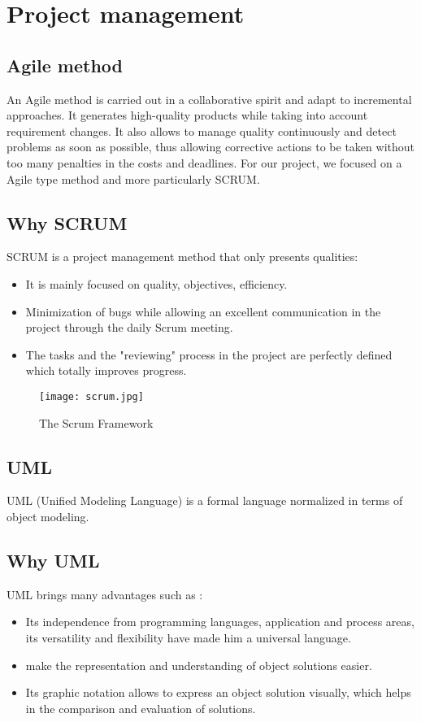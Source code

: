 \section{Project management}

\subsection{Agile method}
An Agile method is carried out in a collaborative spirit and adapt to incremental approaches. It generates high-quality products while taking into account requirement changes. It also allows
to manage quality continuously and detect problems as soon as possible,
thus allowing corrective actions to be taken without too many penalties in the
costs and deadlines. For our project, we focused on a
Agile type method and more particularly SCRUM\cite{cite0}.

\subsection{Why SCRUM}
SCRUM is a project management method that only presents qualities: 

\begin{itemize}
  \item It is mainly focused on quality, objectives, efficiency.
  \item Minimization of bugs while allowing an excellent communication in the project through the daily Scrum meeting.
  \item The tasks and the "reviewing" process in the project are perfectly defined which totally improves progress.
\end{itemize}


\vfill
\clearpage

\begin{figure}[!ht]
    \centering
    \texttt{[image: scrum.jpg]}
    \caption{The Scrum Framework}
    \label{fig:scrum}
\end{figure}



\subsection{UML\cite{cite1}}

UML (Unified Modeling Language) is a formal language normalized in terms of
object modeling.

\subsection{Why UML}
UML brings many advantages such as :
\begin{itemize}
  \item Its independence from programming languages, application and process areas, its versatility and flexibility have made him a universal language.
  \item make the representation and understanding of object solutions easier.
  \item Its graphic notation allows to express an object solution visually, which helps in the comparison and evaluation of solutions.
\end{itemize}

